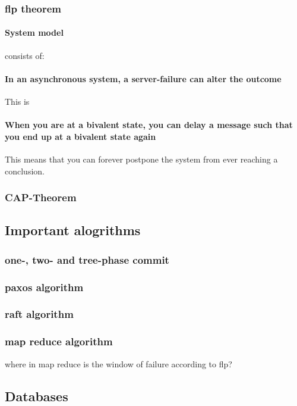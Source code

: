 \subsubsection{flp theorem}

\paragraph{System model} consists of:
\paragraph{In an asynchronous system, a server-failure can alter the outcome} This is
\paragraph{When you are at a bivalent state, you can delay a message such that you end up at a bivalent state again} This means that you can forever postpone the system from ever reaching a conclusion. 

\subsubsection{CAP-Theorem}


\subsection{Important alogrithms}

\subsubsection{one-, two- and tree-phase commit}

\subsubsection{paxos algorithm}

\subsubsection{raft algorithm}

\subsubsection{map reduce algorithm}
where in map reduce is the window of failure according to flp?


\subsection{Databases}

